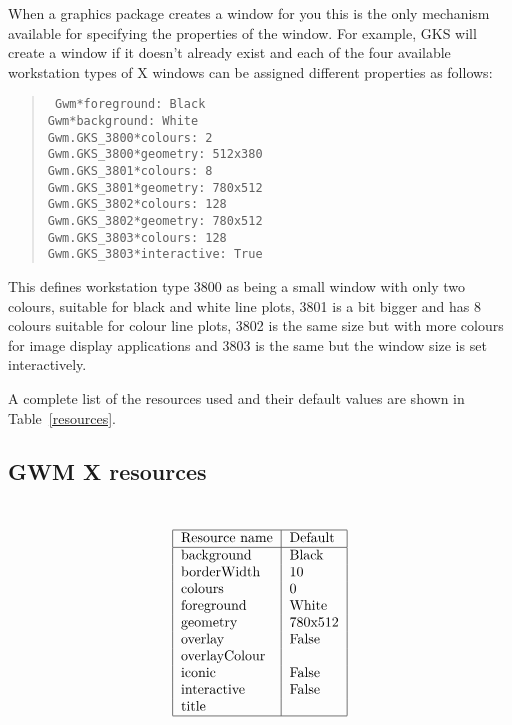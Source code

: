 When a graphics package creates a window for you this is the only mechanism
available for specifying the properties of the window. For example, GKS will
create a window if it doesn't already exist and each of the four available
workstation types of X windows can be assigned different properties as follows:
\begin{quote}{\tt
Gwm*foreground: Black\\
Gwm*background: White\\
Gwm.GKS\_3800*colours: 2\\
Gwm.GKS\_3800*geometry: 512x380\\
Gwm.GKS\_3801*colours: 8\\
Gwm.GKS\_3801*geometry: 780x512\\
Gwm.GKS\_3802*colours: 128\\
Gwm.GKS\_3802*geometry: 780x512\\
Gwm.GKS\_3803*colours: 128\\
Gwm.GKS\_3803*interactive: True}
\end{quote}
This defines workstation type 3800 as being a small window with only two
colours, suitable for black and white line plots, 3801 is a bit bigger and has
8 colours suitable for colour line plots, 3802 is the same size but with more
colours for image display applications and 3803 is the same but the window size
is set interactively.

A complete list of the resources used and their default values are shown in 
Table~\ref{resources}.
\begin{htmlonly}
\subsection{GWM X resources}
\end{htmlonly}
\begin{table}\caption{GWM X resources\label{resources}}\tt
\[\begin{tabular}{|l|l|}\hline
\rm Resource name &\rm Default\\ \hline
background &Black\\
borderWidth &10\\
colours & 0\\
foreground &White\\
geometry &780x512\\
overlay &False\\
overlayColour &\\
iconic &False\\
interactive &False\\
title &\\\hline 
\end{tabular}\]
\end{table}

